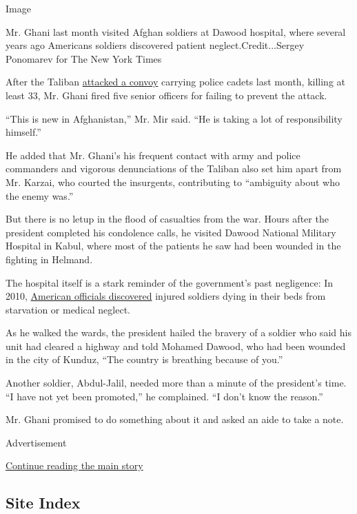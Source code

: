 Image

Mr. Ghani last month visited Afghan soldiers at Dawood hospital, where
several years ago Americans soldiers discovered patient
neglect.Credit...Sergey Ponomarev for The New York Times

After the Taliban
\href{http://www.nytimes3xbfgragh.onion/2016/07/01/world/asia/taliban-afghanistan-police-convoy-bombings.html}{attacked
a convoy} carrying police cadets last month, killing at least 33, Mr.
Ghani fired five senior officers for failing to prevent the attack.

``This is new in Afghanistan,'' Mr. Mir said. ``He is taking a lot of
responsibility himself.''

He added that Mr. Ghani's his frequent contact with army and police
commanders and vigorous denunciations of the Taliban also set him apart
from Mr. Karzai, who courted the insurgents, contributing to ``ambiguity
about who the enemy was.''

But there is no letup in the flood of casualties from the war. Hours
after the president completed his condolence calls, he visited Dawood
National Military Hospital in Kabul, where most of the patients he saw
had been wounded in the fighting in Helmand.

The hospital itself is a stark reminder of the government's past
negligence: In 2010,
\href{http://www.wsj.com/articles/SB10001424053111904480904576496703389391710}{American
officials discovered} injured soldiers dying in their beds from
starvation or medical neglect.

As he walked the wards, the president hailed the bravery of a soldier
who said his unit had cleared a highway and told Mohamed Dawood, who had
been wounded in the city of Kunduz, ``The country is breathing because
of you.''

Another soldier, Abdul-Jalil, needed more than a minute of the
president's time. ``I have not yet been promoted,'' he complained. ``I
don't know the reason.''

Mr. Ghani promised to do something about it and asked an aide to take a
note.

Advertisement

\protect\hyperlink{after-bottom}{Continue reading the main story}

\hypertarget{site-index}{%
\subsection{Site Index}\label{site-index}}

